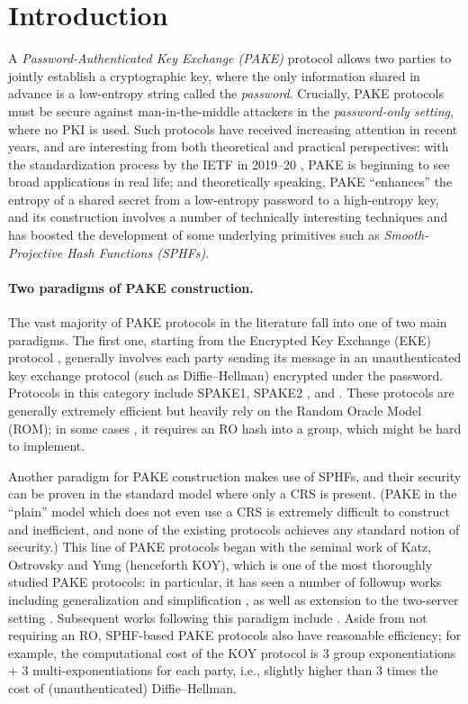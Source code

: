 \section{Introduction}
A \emph{Password-Authenticated Key Exchange (PAKE)} protocol allows two parties to jointly establish a cryptographic key, where the only information shared in advance is a low-entropy string called the \emph{password}. Crucially, PAKE protocols must be secure against man-in-the-middle attackers in the \emph{password-only setting}, where no PKI is used. Such protocols have received increasing attention in recent years, and are interesting from both theoretical and practical perspectives: with the standardization process by the IETF in 2019--20 \cite{pake-selection}, PAKE is beginning to see broad applications in real life; and theoretically speaking, PAKE ``enhances'' the entropy of a shared secret from a low-entropy password to a high-entropy key, and its construction involves a number of technically interesting techniques and has boosted the development of some underlying primitives such as \emph{Smooth-Projective Hash Functions (SPHFs)}.

\paragraph{Two paradigms of PAKE construction.}
The vast majority of PAKE protocols in the literature fall into one of two main paradigms. The first one, starting from the Encrypted Key Exchange (EKE) protocol \cite{SP:BelMer92}, generally involves each party sending its message in an unauthenticated key exchange protocol (such as Diffie--Hellman) encrypted under the password. Protocols in this category include SPAKE1, SPAKE2 \cite{RSA:AbdPoi05}, and . These protocols are generally extremely efficient but heavily rely on the Random Oracle Model (ROM); in some cases \cite{SP:BelMer92}, it requires an RO hash into a group, which might be hard to implement.

Another paradigm for PAKE construction makes use of SPHFs, and their security can be proven in the standard model where only a CRS is present. (PAKE in the ``plain'' model which does not even use a CRS is extremely difficult to construct and inefficient, and none of the existing protocols \cite{C:GolLin01,TCC:NguVad04,C:GoyJaiOst10} achieves any standard notion of security.) This line of PAKE protocols began with the seminal work of Katz, Ostrovsky and Yung \cite{EC:KatOstYun01} (henceforth KOY), which is one of the most thoroughly studied PAKE protocols: in particular, it has seen a number of followup works including generalization \cite{EC:GenLin03} and simplification \cite{PKC:AbdBenPoi15}, as well as extension to the two-server setting \cite{ACNS:KMTG05}. Subsequent works following this paradigm include \cite{SAC:JiaGon04,CCS:GroKat10,AC:KatVai09a,TCC:KatVai11}. Aside from not requiring an RO, SPHF-based PAKE protocols also have reasonable efficiency; for example, the computational cost of the KOY protocol is 3 group exponentiations + 3 multi-exponentiations for each party, i.e., slightly higher than 3 times the cost of (unauthenticated) Diffie--Hellman.

